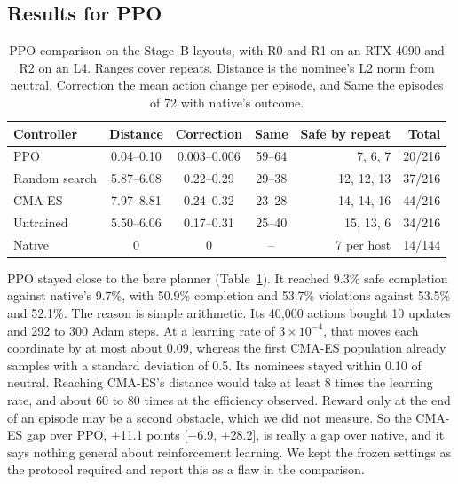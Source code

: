\documentclass[dvipsnames,format=sigconf]{acmart}
\newcommand{\cmaes}{CMA-ES}
\begin{document}
\subsection{Results for PPO}
\label{sec:rq3}

\begin{table}[t]
\caption{PPO comparison on the Stage~B layouts, with R0 and R1 on an RTX 4090 and R2 on an L4. Ranges cover
repeats. Distance is the nominee's L2 norm from neutral, Correction the mean action change per episode, and
Same the episodes of 72 with native's outcome.}
\label{tab:ppo}
\small
\setlength{\tabcolsep}{3pt}
\begin{tabular}{@{}lcccrr@{}}
\toprule
Controller & Distance & Correction & Same & Safe by repeat & Total \\
\midrule
PPO & 0.04--0.10 & 0.003--0.006 & 59--64 & 7, 6, 7 & 20/216 \\
Random search & 5.87--6.08 & 0.22--0.29 & 29--38 & 12, 12, 13 & 37/216 \\
\cmaes{} & 7.97--8.81 & 0.24--0.32 & 23--28 & 14, 14, 16 & 44/216 \\
Untrained & 5.50--6.06 & 0.17--0.31 & 25--40 & 15, 13, 6 & 34/216 \\
Native & 0 & 0 & -- & 7 per host & 14/144 \\
\bottomrule
\end{tabular}
\end{table}

PPO stayed close to the bare planner (Table~\ref{tab:ppo}). It reached 9.3\% safe completion against native's
9.7\%, with 50.9\% completion and 53.7\% violations against 53.5\% and 52.1\%. The reason is simple arithmetic.
Its 40,000 actions bought 10 updates and 292 to 300 Adam steps. At a learning rate of $3\times10^{-4}$, that
moves each coordinate by at most about 0.09, whereas the first \cmaes{} population already samples with a
standard deviation of 0.5. Its nominees stayed within 0.10 of neutral. Reaching \cmaes{}'s distance would take
at least 8 times the learning rate, and about 60 to 80 times at the efficiency observed. Reward only at the end
of an episode may be a second obstacle, which we did not measure.
So the \cmaes{} gap over PPO, +11.1 points [$-$6.9, +28.2], is really a gap over native, and it says nothing
general about reinforcement learning. We kept the frozen settings as the protocol required and report this
as a flaw in the comparison.
\end{document}
